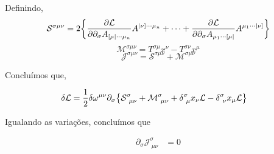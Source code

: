 \documentclass[twoside]{amsart}
\numberwithin{equation}{section}
\begin{document}
Definindo,$$\mathcal S^{\sigma\mu\nu}=2\qty{\pdv{\mathcal L}{\partial_\sigma A_{[\mu|\cdots\mu_n}}A^{|\nu]\cdots\mu_n}+\cdots+\pdv{\mathcal L}{\partial_\sigma A_{\mu_1\cdots[\mu|}}A^{\mu_1\cdots|\nu]}}$$ $$\mathcal M^{\sigma\mu\nu}=T^{\sigma\mu}x^\nu-T^{\sigma\nu}x^\mu$$ $$\mathcal J^{\sigma\mu\nu}=\mathcal S^{\sigma\mu\nu}+\mathcal M^{\sigma\mu\nu}$$

Concluímos que,

\begin{align}
    \delta\mathcal L&=\frac12\delta\omega^{\mu\nu}\partial_\sigma\qty{\mathcal S^{\sigma}_{\ \mu\nu}+\mathcal M^{\sigma}_{\ \mu\nu}+\delta^\sigma_{\ \mu}x_\nu\mathcal L-\delta^{\sigma}_{\ \nu}x_\mu\mathcal L}
\end{align}

Igualando as variações, concluímos que 

\begin{align}
    \partial_\sigma\mathcal J^{\sigma}_{\ \mu\nu}&=0
\end{align}


\end{document}
